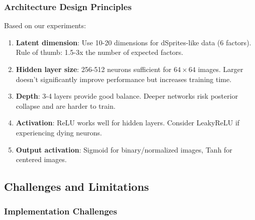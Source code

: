 \documentclass[conference]{IEEEtran}
\begin{document}
\subsubsection{Architecture Design Principles}

Based on our experiments:
\begin{enumerate}
    \item \textbf{Latent dimension}: Use 10-20 dimensions for dSprites-like data (6 factors). Rule of thumb: 1.5-3x the number of expected factors.
    
    \item \textbf{Hidden layer size}: 256-512 neurons sufficient for $64 \times 64$ images. Larger doesn't significantly improve performance but increases training time.
    
    \item \textbf{Depth}: 3-4 layers provide good balance. Deeper networks risk posterior collapse and are harder to train.
    
    \item \textbf{Activation}: ReLU works well for hidden layers. Consider LeakyReLU if experiencing dying neurons.
    
    \item \textbf{Output activation}: Sigmoid for binary/normalized images, Tanh for centered images.
\end{enumerate}

\subsection{Challenges and Limitations}

\subsubsection{Implementation Challenges}
\end{document}
